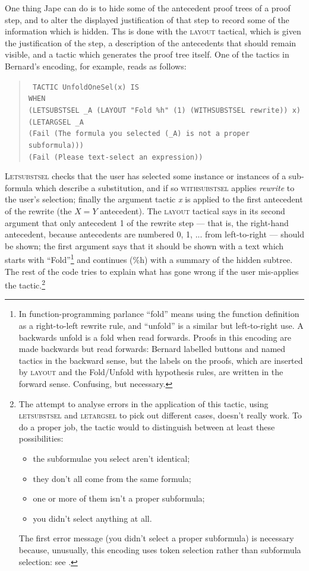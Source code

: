 One thing Jape can do is to hide some of the antecedent proof trees of a proof step, and to alter the displayed justification of that step to record some of the information which is hidden. Ths is done with the \textsc{layout} tactical, which is given the justification of the step, a description of the antecedents that should remain visible, and a tactic which generates the proof tree itself. One of the tactics in Bernard's encoding, for example, reads as follows:
\begin{quote}\tt\small
TACTIC UnfoldOneSel(x) IS \\
\tab WHEN    \\
\tab \tab (LETSUBSTSEL \_A (LAYOUT "Fold \%h" (1) (WITHSUBSTSEL rewrite)) x) \\
\tab \tab (LETARGSEL \_A \\
\tab \tab \tab (Fail (The formula you selected (\_A) is not a proper subformula))) \\
\tab \tab (Fail (Please text-select an expression))
\end{quote}
\textsc{Letsubstsel} checks that the user has selected some instance or instances of a sub-formula which describe a substitution, and if so \textsc{withsubstsel} applies \textit{rewrite} to the user's selection; finally the argument tactic \textit{x} is applied to the first antecedent of the rewrite (the $X=Y$ antecedent). The \textsc{layout} tactical says in its second argument that only antecedent 1 of the rewrite step --- that is, the right-hand antecedent, because antecedents are numbered 0, 1, ... from left-to-right --- should be shown; the first argument says that it should be shown with a text which starts with ``Fold''\footnote{In function-programming parlance ``fold'' means using the function definition as a right-to-left rewrite rule, and ``unfold'' is a similar but left-to-right use. A backwards unfold is a fold when read forwards. Proofs in this encoding are made backwards but read forwards: Bernard labelled buttons and named tactics in the backward sense, but the labels on the proofs, which are inserted by \textsc{layout} and the Fold/Unfold with hypothesis rules, are written in the forward sense. Confusing, but necessary.} and continues (\%h) with a summary of the hidden subtree. The rest of the code tries to explain what has gone wrong if the user mis-applies the tactic.\footnote{The attempt to analyse errors in the application of this tactic, using \textsc{letsubstsel} and \textsc{letargsel} to pick out different cases, doesn't really work. To do a proper job, the tactic would to distinguish between at least these possibilities:
\begin{itemize}
\item the subformulae you select aren't identical;
\item they don't all come from the same formula;
\item one or more of them isn't a proper subformula;
\item you didn't select anything at all.
\end{itemize}
The first error message (you didn't select a proper subformula) is necessary because, unusually, this encoding uses token selection rather than subformula selection: see .}

